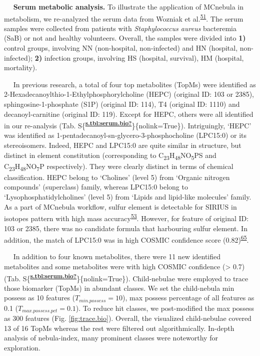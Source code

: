    \textbf{Serum metabolic analysis.} To illustrate the application of
MCnebula in metabolism, we re-analyzed the serum data from Wozniak et
al.\textsuperscript{\protect\hyperlink{ref-2020s}{51}}. The serum
samples were collected from patients with \emph{Staphylococcus aureus}
bacteremia (SaB) or not and healthy volunteers. Overall, the samples
were divided into \textbf{1)} control groups, involving NN
(non-hospital, non-infected) and HN (hospital, non-infected);
\textbf{2)} infection groups, involving HS (hospital, survival), HM
(hospital, mortality).

   In previous research, a total of four top metabolites (TopMs) were
identified as 2-Hexadecanoylthio-1-Ethylphosphorylcholine (HEPC)
(original ID: 103 or 2385), sphingosine-1-phosphate (S1P) (original ID:
114), T4 (original ID: 1110) and decanoyl-carnitine (original ID: 119).
Except for HEPC, others were all identified in our re-analysis (Tab.
S\{\textsuperscript{\protect\hyperlink{ref-s.tbl:serum.bio}{\textbf{s.tbl:serum.bio?}}}\}\{nolink=True\}).
Intriguingly, `HEPC' was identified as
1-pentadecanoyl-sn-glycero-3-phosphocholine (LPC15:0) or its
stereoisomers. Indeed, HEPC and LPC15:0 are quite similar in structure,
but distinct in element constitution (corresponding to
C\textsubscript{23}H\textsubscript{48}NO\textsubscript{5}PS and
C\textsubscript{23}H\textsubscript{48}NO\textsubscript{7}P
respectively). They were clearly distinct in terms of chemical
classification. HEPC belong to `Cholines' (level 5) from `Organic
nitrogen compounds' (superclass) family, whereas LPC15:0 belong to
`Lysophosphatidylcholines' (level 5) from `Lipids and lipid-like
molecules' family. As a part of MCnebula workflow, sulfur element is
detectable for SIRIUS in isotopes pattern with high mass
accuracy\textsuperscript{\protect\hyperlink{ref-2009}{53}}. However, for
feature of original ID: 103 or 2385, there was no candidate formula that
harbouring sulfur element. In addition, the match of LPC15:0 was in high
COSMIC confidence score
(0.82)\textsuperscript{\protect\hyperlink{ref-2021}{65}}.

   In addition to four known metabolites, there were 11 new identified
metabolites and some metabolites were with high COSMIC confidence
(\textgreater{} 0.7) (Tab.
S\{\textsuperscript{\protect\hyperlink{ref-s.tbl:serum.bio}{\textbf{s.tbl:serum.bio?}}}\}\{nolink=True\}).
Child-nebulae were employed to trace those biomarker (TopMs) in abundant
classes. We set the child-nebula min possess as 10 features
(\(T_{min.possess} = 10\)), max possess percentage of all features as
0.1 (\(T_{max.possess.pct} = 0.1\)). To reduce hit classes, we
post-modified the max possess as 300 features (Fig.
{\protect\NoHyper\ref{fig:trace.bio}\protect\endNoHyper}). Overall, the
visualized child-nebulae covered 13 of 16 TopMs whereas the rest were
filtered out algorithmically. In-depth analysis of nebula-index, many
prominent classes were noteworthy for exploration.

